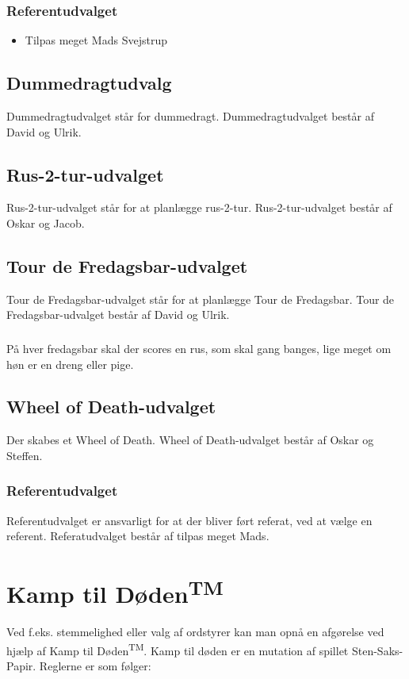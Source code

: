 \documentclass{article}
\begin{document}
\subsubsection{Referentudvalget}
\begin{itemize}
    \item Tilpas meget Mads Svejstrup
\end{itemize}

\subsection{Dummedragtudvalg}
Dummedragtudvalget står for dummedragt. Dummedragtudvalget består af David og Ulrik.
\subsection{Rus-2-tur-udvalget}
Rus-2-tur-udvalget står for at planlægge rus-2-tur. Rus-2-tur-udvalget består af Oskar og Jacob.
\subsection{Tour de Fredagsbar-udvalget}
Tour de Fredagsbar-udvalget står for at planlægge Tour de Fredagsbar. Tour de Fredagsbar-udvalget består af David og Ulrik.
\subsubsection{}
På hver fredagsbar skal der scores en rus, som skal gang banges, lige meget om høn er en dreng eller pige.
\subsection{Wheel of Death-udvalget}
Der skabes et Wheel of Death. Wheel of Death-udvalget består af Oskar og Steffen.
\subsubsection{Referentudvalget}
Referentudvalget er ansvarligt for at der bliver ført referat, ved at vælge en referent. Referatudvalget består af tilpas meget Mads.


\section{Kamp til Døden\textsuperscript{TM}}
Ved f.eks. stemmelighed eller valg af ordstyrer kan man opnå en afgørelse ved hjælp af Kamp til Døden\textsuperscript{TM}. Kamp til døden er en mutation af spillet Sten-Saks-Papir. Reglerne er som følger:
\end{document}
